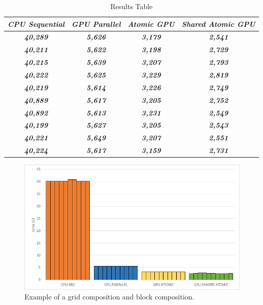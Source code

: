\documentclass[conference]{IEEEtran}
\begin{document}
\begin{table}[htbp]
	\caption{Results Table} %
	\begin{center}
		\begin{tabular}{|c|c|c|c|}
		\hline
			\textbf{\textit{CPU Sequential}} & \textbf{\textit{GPU Parallel}} & \textbf{\textit{Atomic GPU}} & \textbf{\textit{Shared Atomic GPU}} \\ \hline
			\textbf{\textit{40,289}} & \textbf{\textit{5,626}} & \textbf{\textit{3,179}} & \textbf{\textit{2,541}} \\ \hline
			\textbf{\textit{40,211}} & \textbf{\textit{5,622}} & \textbf{\textit{3,198}} & \textbf{\textit{2,729}} \\ \hline
			\textbf{\textit{40,215}} & \textbf{\textit{5,639}} & \textbf{\textit{3,207}} & \textbf{\textit{2,793}} \\ \hline
			\textbf{\textit{40,222}} & \textbf{\textit{5,625}} & \textbf{\textit{3,229}} & \textbf{\textit{2,819}} \\ \hline
			\textbf{\textit{40,219}} & \textbf{\textit{5,614}} & \textbf{\textit{3,226}} & \textbf{\textit{2,749}} \\ \hline
			\textbf{\textit{40,889}} & \textbf{\textit{5,617}} & \textbf{\textit{3,205}} & \textbf{\textit{2,752}} \\ \hline
			\textbf{\textit{40,892}} & \textbf{\textit{5,613}} & \textbf{\textit{3,231}} & \textbf{\textit{2,549}} \\ \hline
			\textbf{\textit{40,199}} & \textbf{\textit{5,627}} & \textbf{\textit{3,205}} & \textbf{\textit{2,543}} \\ \hline
			\textbf{\textit{40,221}} & \textbf{\textit{5,649}} & \textbf{\textit{3,207}} & \textbf{\textit{2,551}} \\ \hline
			\textbf{\textit{40,224}} & \textbf{\textit{5,617}} & \textbf{\textit{3,159}} & \textbf{\textit{2,731}} \\ \hline
	\end{tabular}
	\label{tab1}
	\end{center}
\end{table}

\begin{figure}[htbp]
	\centerline{\includegraphics[width=\linewidth]{figures/graph_results.png}}
	\caption{Example of a grid composition and block composition.}
	\label{fig1}
\end{figure}
	
\end{document}
